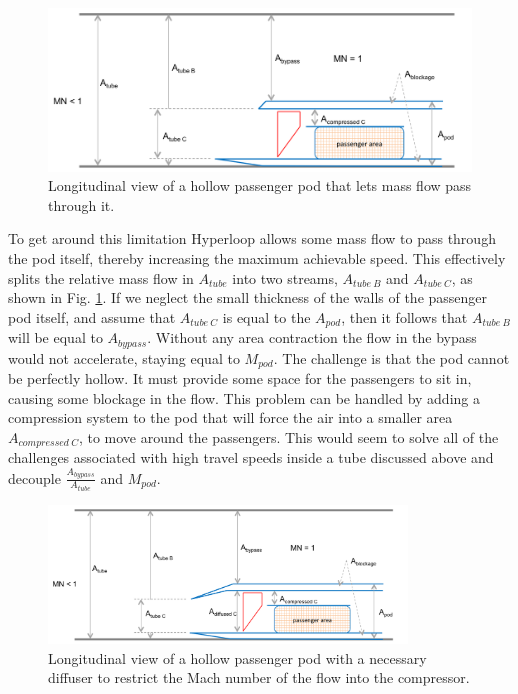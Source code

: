 \documentclass[heading.tex]{subfiles}
\begin{document}
\begin{figure}[hbtp]
\centering
\includegraphics[width=.85\textwidth]{images/podB}
\caption{Longitudinal view of a hollow passenger pod that lets mass flow pass through it.}
\label{f:hollowPod}
\end{figure}

To get around this limitation Hyperloop allows some mass flow to pass through the pod itself, thereby increasing
the maximum achievable speed. This effectively splits the relative mass flow in $A_{tube}$ into two streams, 
$A_{tube\ B}$ and  $A_{tube\ C}$, as shown in Fig. \ref{f:hollowPod}. If we neglect the small thickness of the walls of
the passenger pod itself, and assume that $A_{tube\ C}$ is equal to the $A_{pod}$, then it follows that $A_{tube\ B}$ 
will be equal to $A_{bypass}$. Without any area contraction the flow in the bypass would not accelerate, staying 
equal to $M_{pod}$. The challenge is that the pod cannot be perfectly hollow. It must provide some space for the passengers
to sit in, causing some blockage in the flow. This problem can be handled by adding a compression system to the 
pod that will force the air into a smaller area $A_{compressed\ C}$, to move around the passengers. This would 
seem to solve all of the challenges associated with high travel speeds inside a tube discussed above and decouple 
$\frac{A_{bypass}}{A_{tube}}$ and ${M_{pod}}$.


\begin{figure}[hbtp]
\centering
\includegraphics[width=0.85\textwidth]{images/podC.png}
\caption{Longitudinal view of a hollow passenger pod with a necessary diffuser to restrict the Mach number of the flow into the compressor.}
\label{f:OpenPod}
\end{figure}
\end{document}

